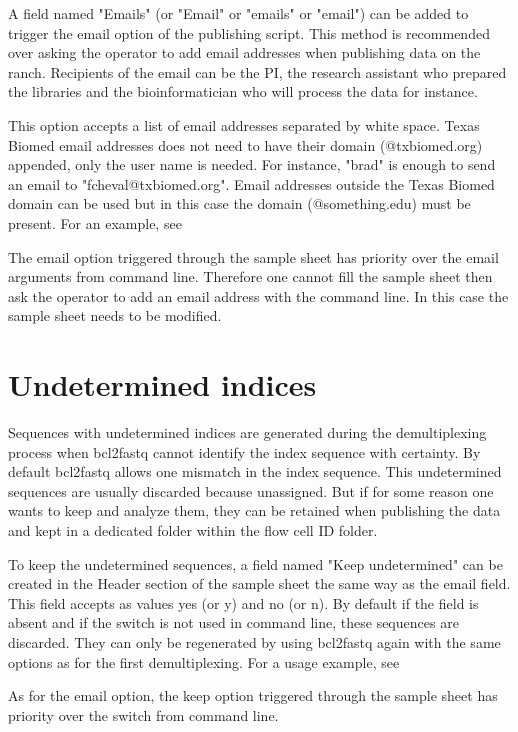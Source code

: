 \documentclass[11pt]{report}
\begin{document}
A field named "Emails" (or "Email" or "emails" or "email") can be added to trigger the email option of the publishing script. This method is recommended over asking the operator to add email addresses when publishing data on the ranch. Recipients of the email can be the PI, the research assistant who prepared the libraries and the bioinformatician who will process the data for instance.

This option accepts a list of email addresses separated by white space. Texas Biomed email addresses does not need to have their domain (@txbiomed.org) appended, only the user name is needed. For instance, "brad" is enough to send an email to "fcheval@txbiomed.org". Email addresses outside the Texas Biomed domain can be used but in this case the domain (@something.edu) must be present. For an example, see 

The email option triggered through the sample sheet has priority over the email arguments from command line. Therefore one cannot fill the sample sheet then ask the operator to add an email address with the command line. In this case the sample sheet needs to be modified.


 \section{Undetermined indices}

Sequences with undetermined indices are generated during the demultiplexing process when bcl2fastq cannot identify the index sequence with certainty. By default bcl2fastq allows one mismatch in the index sequence. This undetermined sequences are usually discarded because unassigned. But if for some reason one wants to keep and analyze them, they can be retained when publishing the data and kept in a dedicated folder within the flow cell ID folder.

To keep the undetermined sequences, a field named "Keep undetermined" can be created in the Header section of the sample sheet the same way as the email field. This field accepts as values yes (or y) and no (or n). By default if the field is absent and if the switch is not used in command line, these sequences are discarded. They can only be regenerated by using bcl2fastq again with the same options as for the first demultiplexing. For a usage example, see 

As for the email option, the keep option triggered through the sample sheet has priority over the switch from command line.
\end{document}
